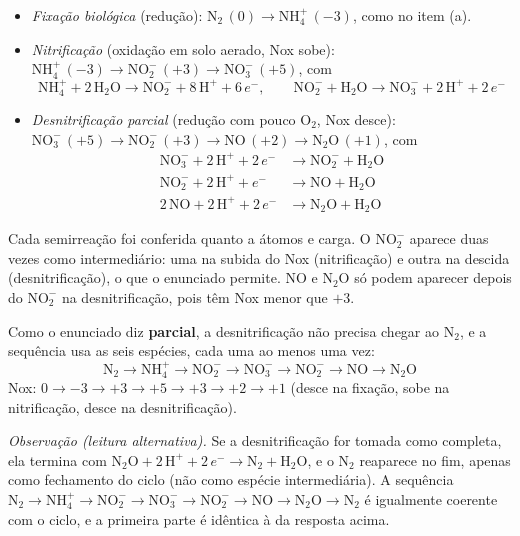 \documentclass{article}%
\begin{document}
\begin{itemize}
\item \emph{Fixação biológica} (redução): $\mathrm{N_2}\,(0) \to \mathrm{NH_4^+}\,(-3)$, como no item (a).
\item \emph{Nitrificação} (oxidação em solo aerado, Nox sobe): $\mathrm{NH_4^+}\,(-3) \to \mathrm{NO_2^-}\,(+3) \to \mathrm{NO_3^-}\,(+5)$, com
\[
\mathrm{NH_4^+} + 2\,\mathrm{H_2O} \to \mathrm{NO_2^-} + 8\,\mathrm{H^+} + 6\,e^-,
\qquad
\mathrm{NO_2^-} + \mathrm{H_2O} \to \mathrm{NO_3^-} + 2\,\mathrm{H^+} + 2\,e^-
\]
\item \emph{Desnitrificação parcial} (redução com pouco $\mathrm{O_2}$, Nox desce): $\mathrm{NO_3^-}\,(+5) \to \mathrm{NO_2^-}\,(+3) \to \mathrm{NO}\,(+2) \to \mathrm{N_2O}\,(+1)$, com
\begin{align*}
\mathrm{NO_3^-} + 2\,\mathrm{H^+} + 2\,e^- &\to \mathrm{NO_2^-} + \mathrm{H_2O}\\
\mathrm{NO_2^-} + 2\,\mathrm{H^+} + e^- &\to \mathrm{NO} + \mathrm{H_2O}\\
2\,\mathrm{NO} + 2\,\mathrm{H^+} + 2\,e^- &\to \mathrm{N_2O} + \mathrm{H_2O}
\end{align*}
\end{itemize}
Cada semirreação foi conferida quanto a átomos e carga. O $\mathrm{NO_2^-}$ aparece duas vezes como intermediário: uma na subida do Nox (nitrificação) e outra na descida (desnitrificação), o que o enunciado permite. $\mathrm{NO}$ e $\mathrm{N_2O}$ só podem aparecer depois do $\mathrm{NO_2^-}$ na desnitrificação, pois têm Nox menor que $+3$.

Como o enunciado diz \textbf{parcial}, a desnitrificação não precisa chegar ao $\mathrm{N_2}$, e a sequência usa as seis espécies, cada uma ao menos uma vez:
\[
\boxed{\mathrm{N_2} \to \mathrm{NH_4^+} \to \mathrm{NO_2^-} \to \mathrm{NO_3^-} \to \mathrm{NO_2^-} \to \mathrm{NO} \to \mathrm{N_2O}}
\]
Nox: $0 \to -3 \to +3 \to +5 \to +3 \to +2 \to +1$ (desce na fixação, sobe na nitrificação, desce na desnitrificação).

\emph{Observação (leitura alternativa).} Se a desnitrificação for tomada como completa, ela termina com $\mathrm{N_2O} + 2\,\mathrm{H^+} + 2\,e^- \to \mathrm{N_2} + \mathrm{H_2O}$, e o $\mathrm{N_2}$ reaparece no fim, apenas como fechamento do ciclo (não como espécie intermediária). A sequência $\mathrm{N_2} \to \mathrm{NH_4^+} \to \mathrm{NO_2^-} \to \mathrm{NO_3^-} \to \mathrm{NO_2^-} \to \mathrm{NO} \to \mathrm{N_2O} \to \mathrm{N_2}$ é igualmente coerente com o ciclo, e a primeira parte é idêntica à da resposta acima.
\end{document}

